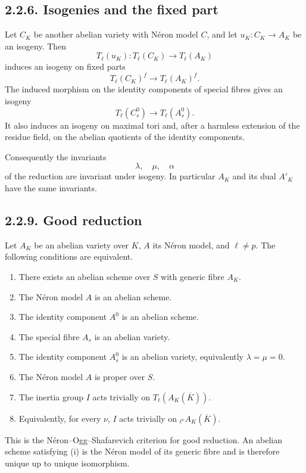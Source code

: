 \documentclass[11pt]{article}
\theoremstyle{plain}
\theoremstyle{definition}
\theoremstyle{remark}
\begin{document}
\subsection*{2.2.6. Isogenies and the fixed part}

Let \(C_K\) be another abelian variety with Néron model \(C\), and let
\(u_K:C_K\to A_K\) be an isogeny. Then
\[
T_\ell(u_K):T_\ell(C_K)\to T_\ell(A_K)
\]
induces an isogeny on fixed parts
\[
T_\ell(C_K)^f\longrightarrow T_\ell(A_K)^f.
\]
The induced morphism on the identity components of special fibres gives an
isogeny
\[
T_\ell(C_s^0)\longrightarrow T_\ell(A_s^0).
\]
It also induces an isogeny on maximal tori and, after a harmless extension of
the residue field, on the abelian quotients of the identity components.

Consequently the invariants
\[
\lambda,\quad \mu,\quad \alpha
\]
of the reduction are invariant under isogeny. In particular \(A_K\) and its dual
\(A'_K\) have the same invariants.

\subsection*{2.2.9. Good reduction}

Let \(A_K\) be an abelian variety over \(K\), \(A\) its Néron model, and
\(\ell\neq p\). The following conditions are equivalent.

\begin{enumerate}[label=(\roman*)]
\item There exists an abelian scheme over \(S\) with generic fibre \(A_K\).
\item The Néron model \(A\) is an abelian scheme.
\item The identity component \(A^0\) is an abelian scheme.
\item The special fibre \(A_s\) is an abelian variety.
\item The identity component \(A_s^0\) is an abelian variety, equivalently
\(\lambda=\mu=0\).
\item The Néron model \(A\) is proper over \(S\).
\item The inertia group \(I\) acts trivially on
\(T_\ell(A_K(\overline K))\).
\item Equivalently, for every \(\nu\), \(I\) acts trivially on
\({}_{\ell^\nu}A_K(\overline K)\).
\end{enumerate}

This is the Néron--Ogg--Shafarevich criterion for good reduction. An abelian
scheme satisfying (i) is the Néron model of its generic fibre and is therefore
unique up to unique isomorphism.
\end{document}

